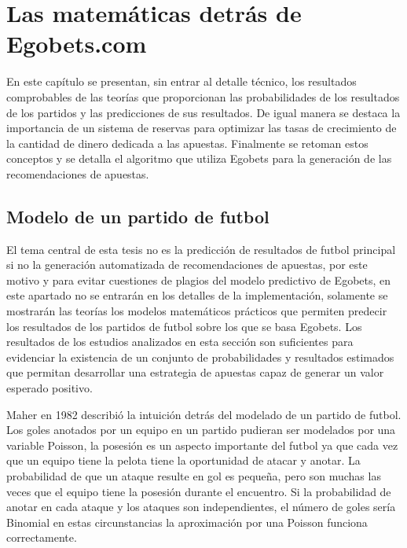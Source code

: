 \graphicspath{{/Users/brunomedina/Dropbox/Tesis-Egobets/egobets-notas/resources/}}

\chapter{Las matemáticas detrás de Egobets.com}
\label{chap:mate}

En este capítulo se presentan, sin entrar al detalle técnico, los resultados comprobables de las teorías que proporcionan las probabilidades de los resultados de los partidos y las predicciones de sus resultados. De igual manera se destaca la importancia de un sistema de reservas para optimizar las tasas de crecimiento de la cantidad de dinero dedicada a las apuestas. Finalmente se retoman estos conceptos y se detalla el algoritmo que utiliza Egobets para la generación de las recomendaciones de apuestas.



\section{Modelo de un partido de futbol}
\label{sec:modelo}

El tema central de esta tesis no es la predicción de resultados de futbol principal si no la generación automatizada de recomendaciones de apuestas, por este motivo y para evitar cuestiones de plagios del modelo predictivo de Egobets, en este apartado no se entrarán en los detalles de la implementación, solamente se mostrarán las teorías los modelos matemáticos prácticos que permiten predecir los resultados de los partidos de futbol sobre los que se basa Egobets. Los resultados de los estudios analizados en esta sección son suficientes para evidenciar la existencia de un conjunto de probabilidades y resultados estimados que permitan desarrollar una estrategia de apuestas capaz de generar un valor esperado positivo.

Maher en 1982 \cite{maher1982modelling} describió la intuición detrás del modelado de un partido de futbol. Los goles anotados por un equipo en un partido pudieran ser modelados por una variable Poisson, la posesión es un aspecto importante del futbol ya que cada vez que un equipo tiene la pelota tiene la oportunidad de atacar y anotar. La probabilidad de que un ataque resulte en gol es pequeña, pero son muchas las veces que el equipo tiene la posesión durante el encuentro. Si la probabilidad de anotar en cada ataque y los ataques son independientes, el número de goles sería Binomial en estas circunstancias la aproximación por una Poisson funciona correctamente.


